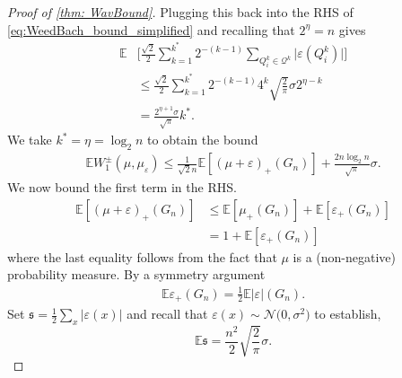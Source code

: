 \documentclass{article}
\theoremstyle{plain}
\theoremstyle{definition}
\theoremstyle{remark}
\begin{document}
\begin{proof}[Proof of \cref{thm: WavBound}]
Plugging this back into the RHS of \eqref{eq:WeedBach_bound_simplified} and recalling that \(2^\eta = n\) gives
\begin{align}
    \mathbb{E}
    &\bigg[
        \frac{\sqrt{2}}{2}
        \sum_{k=1}^{k^*} 2^{-(k-1)} 
        \sum_{Q_i^k\in \mathcal{Q}^k} \lvert \varepsilon(Q_i^k)  \rvert
    \bigg]
    \\
    &\le
    \frac{\sqrt{2}}{2}
    \sum_{k=1}^{k^*} 2^{-(k-1)}
    4^k \sqrt{\frac{2}\pi} \sigma  2^{\eta-k} \nonumber
   \\
    &=
    \frac{2^{\eta+1} \sigma}{\sqrt{\pi}}
    k^* . \nonumber
\end{align}
We take \(k^* = \eta = \log_2 n\) to obtain the bound
\begin{align} \label{ineq:EW1}
    \mathbb{E} W_1^\pm\left(\mu, \mu_\varepsilon\right)
    \le
    \frac{1}{\sqrt{2}n}
    \mathbb{E} \left[ (\mu + \varepsilon)_+ (G_n) \right]
    +
    \frac{2n \log_2 n }{\sqrt{\pi}} \sigma.
\end{align}
We now bound the first term in the RHS.
\begin{align}
\label{eq: boundMass}
    \mathbb{E} \left[ (\mu + \varepsilon)_+ (G_n) \right]
    &\le
    \mathbb{E}[\mu_+(G_n)] + \mathbb{E}[\varepsilon_+(G_n)]
    \\
    &=
    1 + \mathbb{E}[\varepsilon_+(G_n)] \nonumber
\end{align}
where the last equality follows from the fact that $\mu$ is a (non-negative) probability measure.
By a symmetry argument
\begin{align}
    \mathbb{E} \varepsilon_+(G_n)
    =
    \tfrac{1}{2} \mathbb{E} |\varepsilon|(G_n).
\end{align}
Set
$\mathfrak{s}=\frac12\sum_{x}|\varepsilon(x)|$ and recall that $\varepsilon(x)\sim\mathcal N\big(0, \sigma^2\big)$ to establish,
\begin{equation}
\mathbb E \mathfrak{s}=\frac{n^2}{2} \sqrt{\frac{2}{\pi}}\sigma.
\end{equation}


\end{proof}
\end{document}

